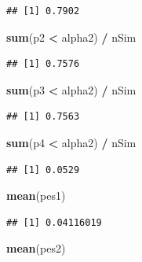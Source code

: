 \documentclass[]{book}
\newenvironment{Shaded}{\begin{snugshade}}{\end{snugshade}}
\newcommand{\KeywordTok}[1]{\textcolor[rgb]{0.13,0.29,0.53}{\textbf{#1}}}
\newcommand{\NormalTok}[1]{#1}
\newcommand{\OperatorTok}[1]{\textcolor[rgb]{0.81,0.36,0.00}{\textbf{#1}}}
\newcommand{\StringTok}[1]{\textcolor[rgb]{0.31,0.60,0.02}{#1}}
\begin{document}
\begin{verbatim}
## [1] 0.7902
\end{verbatim}

\begin{Shaded}
\begin{Highlighting}[]
\KeywordTok{sum}\NormalTok{(p2 }\OperatorTok{<}\StringTok{ }\NormalTok{alpha2) }\OperatorTok{/}\StringTok{ }\NormalTok{nSim}
\end{Highlighting}
\end{Shaded}

\begin{verbatim}
## [1] 0.7576
\end{verbatim}

\begin{Shaded}
\begin{Highlighting}[]
\KeywordTok{sum}\NormalTok{(p3 }\OperatorTok{<}\StringTok{ }\NormalTok{alpha2) }\OperatorTok{/}\StringTok{ }\NormalTok{nSim}
\end{Highlighting}
\end{Shaded}

\begin{verbatim}
## [1] 0.7563
\end{verbatim}

\begin{Shaded}
\begin{Highlighting}[]
\KeywordTok{sum}\NormalTok{(p4 }\OperatorTok{<}\StringTok{ }\NormalTok{alpha2) }\OperatorTok{/}\StringTok{ }\NormalTok{nSim}
\end{Highlighting}
\end{Shaded}

\begin{verbatim}
## [1] 0.0529
\end{verbatim}

\begin{Shaded}
\begin{Highlighting}[]
\KeywordTok{mean}\NormalTok{(pes1)}
\end{Highlighting}
\end{Shaded}

\begin{verbatim}
## [1] 0.04116019
\end{verbatim}

\begin{Shaded}
\begin{Highlighting}[]
\KeywordTok{mean}\NormalTok{(pes2)}
\end{Highlighting}
\end{Shaded}
\end{document}

